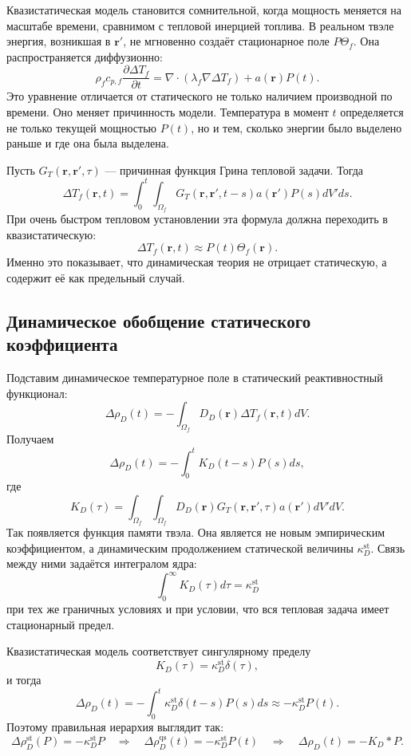 \documentclass[12pt]{article}
\begin{document}
Квазистатическая модель становится сомнительной, когда мощность меняется на масштабе времени, сравнимом с тепловой инерцией топлива. В реальном твэле энергия, возникшая в \(\mathbf r'\), не мгновенно создаёт стационарное поле \(P\Theta_f\). Она распространяется диффузионно:
\[
\rho_f c_{p,f}\frac{\partial\Delta T_f}{\partial t}
=
\nabla\cdot\left(\lambda_f\nabla\Delta T_f\right)
+
a(\mathbf r)P(t).
\]
Это уравнение отличается от статического не только наличием производной по времени. Оно меняет причинность модели. Температура в момент \(t\) определяется не только текущей мощностью \(P(t)\), но и тем, сколько энергии было выделено раньше и где она была выделена.

Пусть \(G_T(\mathbf r,\mathbf r',\tau)\) --- причинная функция Грина тепловой задачи. Тогда
\[
\Delta T_f(\mathbf r,t)
=
\int_0^t\int_{\Omega_f}
G_T(\mathbf r,\mathbf r',t-s)
a(\mathbf r')P(s)dV'ds.
\]
При очень быстром тепловом установлении эта формула должна переходить в квазистатическую:
\[
\Delta T_f(\mathbf r,t)
\approx
P(t)\Theta_f(\mathbf r).
\]
Именно это показывает, что динамическая теория не отрицает статическую, а содержит её как предельный случай.

\subsection{Динамическое обобщение статического коэффициента}

Подставим динамическое температурное поле в статический реактивностный функционал:
\[
\Delta\rho_D(t)
=
-
\int_{\Omega_f}D_D(\mathbf r)\Delta T_f(\mathbf r,t)dV.
\]
Получаем
\[
\Delta\rho_D(t)
=
-
\int_0^t K_D(t-s)P(s)ds,
\]
где
\[
\boxed{
K_D(\tau)
=
\int_{\Omega_f}\int_{\Omega_f}
D_D(\mathbf r)
G_T(\mathbf r,\mathbf r',\tau)
a(\mathbf r')dV'dV.
}
\]
Так появляется функция памяти твэла. Она является не новым эмпирическим коэффициентом, а динамическим продолжением статической величины \(\kappa_D^{\mathrm{st}}\). Связь между ними задаётся интегралом ядра:
\[
\boxed{
\int_0^\infty K_D(\tau)d\tau
=
\kappa_D^{\mathrm{st}}
}
\]
при тех же граничных условиях и при условии, что вся тепловая задача имеет стационарный предел.

Квазистатическая модель соответствует сингулярному пределу
\[
K_D(\tau)=\kappa_D^{\mathrm{st}}\delta(\tau),
\]
и тогда
\[
\Delta\rho_D(t)
=-\int_0^t\kappa_D^{\mathrm{st}}\delta(t-s)P(s)ds
\approx
-\kappa_D^{\mathrm{st}}P(t).
\]
Поэтому правильная иерархия выглядит так:
\[
\boxed{
\Delta\rho_D^{\mathrm{st}}(P)=-\kappa_D^{\mathrm{st}}P
\quad\Longrightarrow\quad
\Delta\rho_D^{\mathrm{qs}}(t)=-\kappa_D^{\mathrm{st}}P(t)
\quad\Longrightarrow\quad
\Delta\rho_D(t)=-K_D*P.
}
\]
\end{document}
